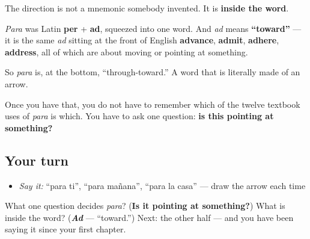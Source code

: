 \begin{cousinweb}
The direction is not a mnemonic somebody invented. It is \textbf{inside the word}.

\emph{Para} was Latin \textbf{per} + \textbf{ad}, squeezed into one word. And \emph{ad} means \textbf{\textquotedblleft{}toward\textquotedblright{}} — it is the same \emph{ad} sitting at the front of English \textbf{advance}, \textbf{admit}, \textbf{adhere}, \textbf{address}, all of which are about moving or pointing at something.

So \emph{para} is, at the bottom, \textquotedblleft{}through-toward.\textquotedblright{} A word that is literally made of an arrow.

Once you have that, you do not have to remember which of the twelve textbook uses of \emph{para} is which. You have to ask one question: \textbf{is this pointing at something?}
\end{cousinweb}

\subsection*{Your turn}
\begin{itemize}
\raggedright
  \item \emph{Say it:} \textquotedblleft{}para ti\textquotedblright{}, \textquotedblleft{}para mañana\textquotedblright{}, \textquotedblleft{}para la casa\textquotedblright{} — draw the arrow each time
\end{itemize}

\begin{tcolorbox}[breakable,colback=teal!4,colframe=teal!35!black,title={Before you move on}]
What one question decides \emph{para}? (\textbf{Is it pointing at something?}) What is inside the word? (\emph{\textbf{Ad}} — \textquotedblleft{}toward.\textquotedblright{}) Next: the other half — and you have been saying it since your first chapter.
\end{tcolorbox}
